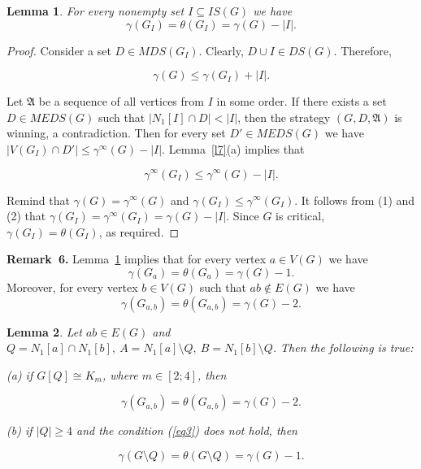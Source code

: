 \documentclass[12pt]{article}
\newtheorem{lemma}{Lemma}
\begin{document}
\begin{lemma}\label{l13}
For every nonempty set $I \subseteq IS(G)$ we have $$\gamma(G_{I}) = \theta(G_{I}) =  \gamma(G) - |I|.$$
\end{lemma}

\begin{proof}
Consider a set $D \in MDS(G_I)$. Clearly, $D \cup I \in DS(G)$. Therefore, 

\begin{equation}
\gamma(G) \leq \gamma(G_I) + |I|.
\end{equation}

Let $\mathfrak{A}$ be a sequence of all vertices from $I$ in some order. If there exists a set $D \in MEDS(G)$ such that $|N_1[I] \cap D| < |I|$, then the strategy $(G,D,\mathfrak{A})$ is winning, a contradiction. Then for every set $D' \in MEDS(G)$ we have $|V(G_I) \cap D'| \leq \gamma^{\infty}(G) - |I|$. Lemma~\ref{l7}(a) implies that 

\begin{equation}
\gamma^{\infty}(G_I) \leq \gamma^{\infty}(G) - |I|.
\end{equation}
 
Remind that $\gamma(G) = \gamma^{\infty}(G)$ and $\gamma(G_I) \leq \gamma^{\infty}(G_I)$. It follows from (1) and (2) that $\gamma(G_I) = \gamma^{\infty}(G_I) = \gamma(G) - |I|$. Since $G$ is critical,  $\gamma(G_{I}) = \theta(G_{I})$, as required.
\end{proof}

\textbf{Remark~6.} Lemma~\ref{l13} implies that for every vertex $a \in V(G)$ we have $$\gamma(G_{a}) = \theta(G_a) = \gamma(G) - 1.$$
Moreover, for every vertex $b \in V(G)$ such that $ab \notin E(G)$ we have
$$\gamma(G_{a,b}) = \theta(G_{a,b}) = \gamma(G) - 2.$$


\begin{lemma}\label{l14}
Let $ab \in E(G)$ and $Q = N_1[a] \cap N_1[b], \ A = N_1[a] \setminus Q, \ B = N_1[b] \setminus Q$. Then the following is true:

(a) if $G[Q] \cong K_m$, where $m \in [2;4]$, then 

\begin{equation}\label{eq3}
\gamma(G_{a,b}) = \theta(G_{a,b}) = \gamma(G) - 2.
\end{equation}

(b) if $|Q| \geq 4$ and the condition (\ref{eq3}) does not hold, then 

\begin{equation}\label{eq4}
\gamma(G \setminus Q) = \theta(G\setminus Q) = \gamma(G) - 1.
\end{equation}


\end{lemma}
\end{document}
